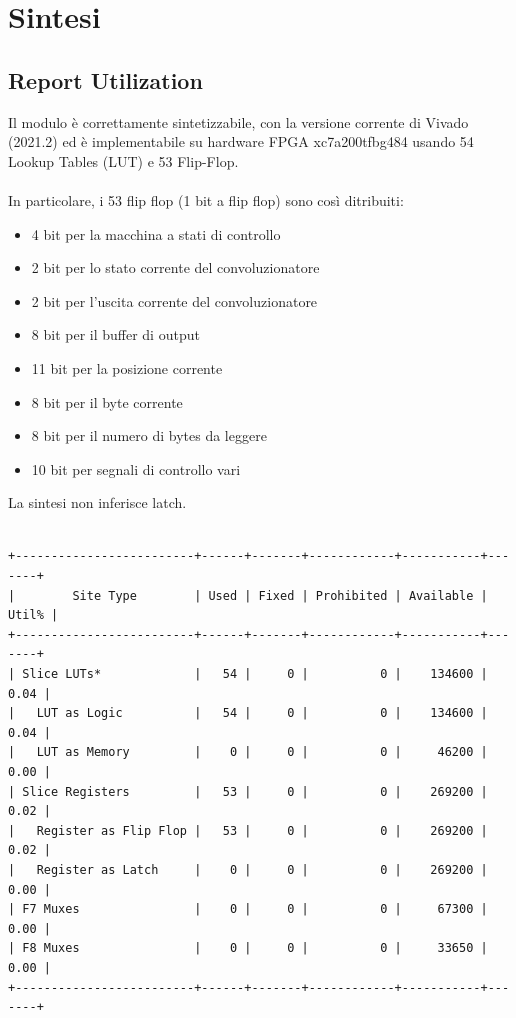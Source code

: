 \documentclass[12pt, a4paper]{article}
\begin{document}
\pagebreak

\section{Sintesi}

\subsection{Report Utilization}

Il modulo è correttamente sintetizzabile, con la versione corrente di Vivado (2021.2) ed è implementabile su hardware FPGA
xc7a200tfbg484 usando 54 Lookup Tables (LUT) e 53 Flip-Flop.
\\
\\
\noindent In particolare, i 53 flip flop (1 bit a flip flop) sono così ditribuiti:
\begin{itemize}[itemsep=4pt, topsep=4pt]
    \item 4 bit per la macchina a stati di controllo
    \item 2 bit per lo stato corrente del convoluzionatore
    \item 2 bit per l'uscita corrente del convoluzionatore
    \item 8 bit per il buffer di output
    \item 11 bit per la posizione corrente
    \item 8 bit per il byte corrente
    \item 8 bit per il numero di bytes da leggere
    \item 10 bit per segnali di controllo vari
\end{itemize}

\noindent La sintesi non inferisce latch.

\begin{verbatim}

+-------------------------+------+-------+------------+-----------+-------+
|        Site Type        | Used | Fixed | Prohibited | Available | Util% |
+-------------------------+------+-------+------------+-----------+-------+
| Slice LUTs*             |   54 |     0 |          0 |    134600 |  0.04 |
|   LUT as Logic          |   54 |     0 |          0 |    134600 |  0.04 |
|   LUT as Memory         |    0 |     0 |          0 |     46200 |  0.00 |
| Slice Registers         |   53 |     0 |          0 |    269200 |  0.02 |
|   Register as Flip Flop |   53 |     0 |          0 |    269200 |  0.02 |
|   Register as Latch     |    0 |     0 |          0 |    269200 |  0.00 |
| F7 Muxes                |    0 |     0 |          0 |     67300 |  0.00 |
| F8 Muxes                |    0 |     0 |          0 |     33650 |  0.00 |
+-------------------------+------+-------+------------+-----------+-------+

\end{verbatim}
\end{document}

